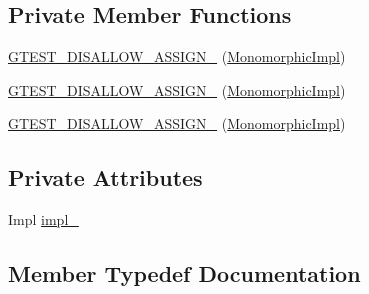 \subsection*{Private Member Functions}
\begin{DoxyCompactItemize}
\item 
\mbox{\hyperlink{classtesting_1_1_polymorphic_action_1_1_monomorphic_impl_af7b6ce4640aac3dcf7126c4b1e86f277}{G\+T\+E\+S\+T\+\_\+\+D\+I\+S\+A\+L\+L\+O\+W\+\_\+\+A\+S\+S\+I\+G\+N\+\_\+}} (\mbox{\hyperlink{classtesting_1_1_polymorphic_action_1_1_monomorphic_impl}{Monomorphic\+Impl}})
\item 
\mbox{\hyperlink{classtesting_1_1_polymorphic_action_1_1_monomorphic_impl_af7b6ce4640aac3dcf7126c4b1e86f277}{G\+T\+E\+S\+T\+\_\+\+D\+I\+S\+A\+L\+L\+O\+W\+\_\+\+A\+S\+S\+I\+G\+N\+\_\+}} (\mbox{\hyperlink{classtesting_1_1_polymorphic_action_1_1_monomorphic_impl}{Monomorphic\+Impl}})
\item 
\mbox{\hyperlink{classtesting_1_1_polymorphic_action_1_1_monomorphic_impl_af7b6ce4640aac3dcf7126c4b1e86f277}{G\+T\+E\+S\+T\+\_\+\+D\+I\+S\+A\+L\+L\+O\+W\+\_\+\+A\+S\+S\+I\+G\+N\+\_\+}} (\mbox{\hyperlink{classtesting_1_1_polymorphic_action_1_1_monomorphic_impl}{Monomorphic\+Impl}})
\end{DoxyCompactItemize}
\subsection*{Private Attributes}
\begin{DoxyCompactItemize}
\item 
Impl \mbox{\hyperlink{classtesting_1_1_polymorphic_action_1_1_monomorphic_impl_a77375e13255f50b45498e0d9c2395d72}{impl\+\_\+}}
\end{DoxyCompactItemize}


\subsection{Member Typedef Documentation}
\mbox{\label{classtesting_1_1_polymorphic_action_1_1_monomorphic_impl_a2d6ef64336f1d5cdac893fb040048c8c}} 
